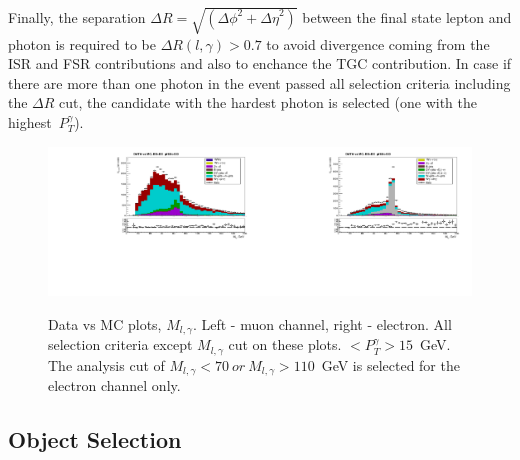 Finally, the separation $\Delta R=\sqrt{({\Delta\phi}^2+{\Delta\eta}^2)}$ between the final state lepton and photon is required to be $\Delta R(l,\gamma)>0.7$ to avoid divergence coming from the ISR and FSR contributions and also to enchance the TGC contribution. In case if there are more than one photon in the event passed all selection criteria including the $\Delta R$ cut, the candidate with the hardest photon is selected (one with the highest~$P_T^{\gamma}$). 

\begin{figure}[htb]
  \begin{center}
   \includegraphics[width=0.5\textwidth]{../figs/figs_v11/MUON_WGamma/PrepareYields/c_TotalDATAvsMC_EtaCommon__Mpholep1_pt15to500_.pdf}\includegraphics[width=0.5\textwidth]{../figs/figs_v11/ELECTRON_WGamma/PrepareYields/c_TotalDATAvsMC_EtaCommon__Mpholep1PRELIMINARY_FOR_E_TO_GAMMA_WITH_PSV_CUT_pt15to500_.pdf}
  \caption{Data vs MC plots, $M_{l,\gamma}$. Left - muon channel, right - electron. All selection criteria except $M_{l,\gamma}$ cut on these plots. $<P_T^{\gamma}>15$~GeV. The analysis cut of $M_{l,\gamma}<70~or~M_{l,\gamma}>110$~GeV is selected for the electron channel only.}
  \label{fig:DATAvsMC_Mpholep1}
  \end{center}
\end{figure}

\subsection{Object Selection}
\label{sec:AN_ObjectSelection}

